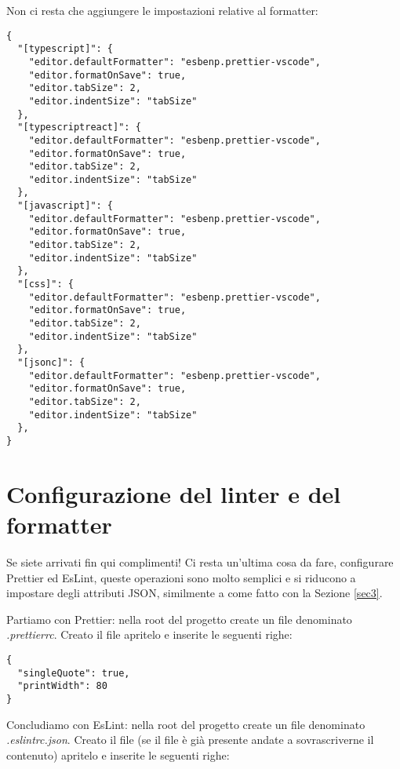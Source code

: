 Non ci resta che aggiungere le impostazioni relative al formatter:
\begin{verbatim}
{
  "[typescript]": {
    "editor.defaultFormatter": "esbenp.prettier-vscode",
    "editor.formatOnSave": true,
    "editor.tabSize": 2,
    "editor.indentSize": "tabSize"
  },
  "[typescriptreact]": {
    "editor.defaultFormatter": "esbenp.prettier-vscode",
    "editor.formatOnSave": true,
    "editor.tabSize": 2,
    "editor.indentSize": "tabSize"
  },
  "[javascript]": {
    "editor.defaultFormatter": "esbenp.prettier-vscode",
    "editor.formatOnSave": true,
    "editor.tabSize": 2,
    "editor.indentSize": "tabSize"
  },
  "[css]": {
    "editor.defaultFormatter": "esbenp.prettier-vscode",
    "editor.formatOnSave": true,
    "editor.tabSize": 2,
    "editor.indentSize": "tabSize"
  },
  "[jsonc]": {
    "editor.defaultFormatter": "esbenp.prettier-vscode",
    "editor.formatOnSave": true,
    "editor.tabSize": 2,
    "editor.indentSize": "tabSize"
  },
}
\end{verbatim}

\newpage

\section{Configurazione del linter e del formatter}
Se siete arrivati fin qui complimenti! Ci resta un'ultima cosa da fare, configurare Prettier ed EsLint, queste operazioni sono molto semplici e si riducono a impostare degli attributi JSON, similmente a come fatto con la Sezione \ref{sec3}.

Partiamo con Prettier: nella root del progetto create un file denominato \textit{.prettierrc}. Creato il file apritelo e inserite le seguenti righe:
\begin{verbatim}
{
  "singleQuote": true,
  "printWidth": 80   
}
\end{verbatim}

Concludiamo con EsLint: nella root del progetto create un file denominato \textit{.eslintrc.json}. Creato il file (se il file è già presente andate a sovrascriverne il contenuto) apritelo e inserite le seguenti righe:
 
